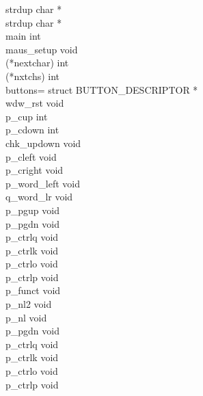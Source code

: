 strdup \> char *\> \pageref{strdup}\\
strdup \> char *\> \pageref{strdup}\\
main \> int \> \pageref{main}\\
maus\_setup \> void \> \pageref{maus_setup}\\
(*nextchar) \> int \> \pageref{(*nextchar)}\\
(*nxtchs) \> int \> \pageref{(*nxtchs)}\\
buttons= \> struct BUTTON\_DESCRIPTOR *\> \pageref{buttons=}\\
wdw\_rst \> void \> \pageref{wdw_rst}\\
p\_cup \> int \> \pageref{p_cup}\\
p\_cdown \> int \> \pageref{p_cdown}\\
chk\_updown \> void \> \pageref{chk_updown}\\
p\_cleft \> void \> \pageref{p_cleft}\\
p\_cright \> void \> \pageref{p_cright}\\
p\_word\_left \> void \> \pageref{p_word_left}\\
q\_word\_lr \> void \> \pageref{q_word_lr}\\
p\_pgup \> void \> \pageref{p_pgup}\\
p\_pgdn \> void \> \pageref{p_pgdn}\\
p\_ctrlq \> void \> \pageref{p_ctrlq}\\
p\_ctrlk \> void \> \pageref{p_ctrlk}\\
p\_ctrlo \> void \> \pageref{p_ctrlo}\\
p\_ctrlp \> void \> \pageref{p_ctrlp}\\
p\_funct \> void \> \pageref{p_funct}\\
p\_nl2 \> void \> \pageref{p_nl2}\\
p\_nl \> void \> \pageref{p_nl}\\

p\_pgdn \> void \> \pageref{p_pgdn}\\
p\_ctrlq \> void \> \pageref{p_ctrlq}\\
p\_ctrlk \> void \> \pageref{p_ctrlk}\\
p\_ctrlo \> void \> \pageref{p_ctrlo}\\
p\_ctrlp \> void \> \pageref{p_ctrlp}\\